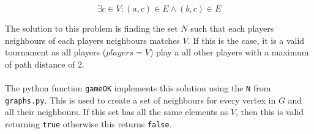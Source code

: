 \documentclass[a4paper]{article}
\begin{document}
\begin{center}
\begin{Large}
\begin{equation}\label{eq:V}
    \exists c \in V : (a, c) \in E \wedge (b, c) \in E
\end{equation}
\end{Large}
\end{center}
The solution to this problem is finding the set $N$ such that each players neighbours of each players neighbours matches $V$. If this is the case, it is a valid tournament as all players ($players = V$) play a all other players with a maximum of path distance of 2.
\\\\
The python function \verb+gameOK+ implements this solution using the \verb+N+ from \verb+graphs.py+. This is used to create a set of neighbours for every vertex in $G$ and all their neighbours. If this set has all the same elements as $V$, then this is valid returning \verb+true+ otherwise this returns \verb+false+.
\end{document}
